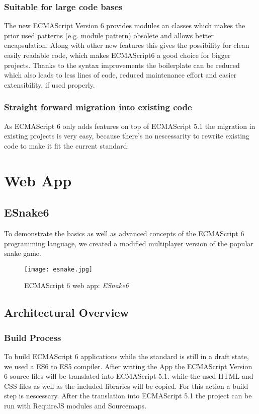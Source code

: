 \documentclass{bioinfo}
\begin{document}
\subsubsection{Suitable for large code bases}
The new ECMAScript Version 6 provides modules an classes which makes the prior used patterns (e.g. module pattern) obsolete
and allows better encapsulation. Along with other new features this gives the possibility for clean easily readable code, 
which makes ECMAScript6 a good choice for bigger projects.
Thanks to the syntax improvements the boilerplate can be reduced which also leads to less lines of code,
reduced maintenance effort and easier extensibility, if used properly.
\subsubsection{Straight forward migration into existing code}
As ECMAScript 6 only adds features on top of ECMAScript 5.1 the migration in existing projects is very easy,
because there's no nescessarity to rewrite existing code to make it fit the current standard.  

\section{Web App}

\subsection{ESnake6}
To demonstrate the basics as well as advanced concepts of the ECMAScript 6 programming language, we created a modified multiplayer version of the 
popular snake game. 
 
\begin{figure}[!tpb]%
\centerline{\texttt{[image: esnake.jpg]}}
\caption{ECMAScript 6 web app: \textit{ESnake6}}\label{fig:03}
\end{figure}

\subsection{Architectural Overview}
\subsubsection{Build Process}
To build ECMAScript 6 applications while the standard is still in a draft state, we used a ES6 to ES5 compiler.
After writing the App the ECMAScript Version 6 source files will be translated into ECMAScript 5.1. while the 
used HTML and CSS files as well as the included libraries will be copied. For this action a build step is nescessary. 
After the translation into ECMAScript 5.1 the project can be run with RequireJS modules and Sourcemaps.
\end{document}
